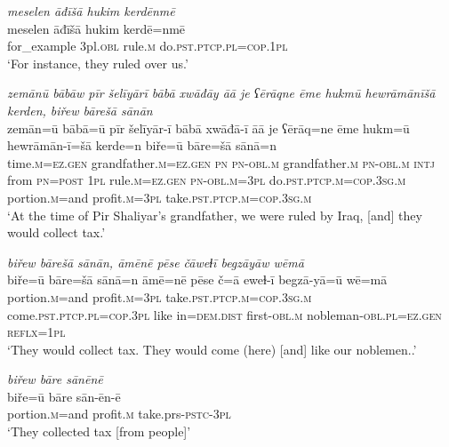 \ea \label{BP.10}
\textit{meselen āđīšā hukim kerdēnmē} \\ 
\gll meselen āđīšā hukim kerdē=nmē \\ 
 for\_example 3pl\textsc{.obl} rule\textsc{.m} do\textsc{.pst}\textsc{.ptcp}\textsc{.pl}\textsc{=cop}\textsc{.\textsc{1pl}} \\ 
\glt `For instance, they ruled over us.'
\z 
 
\ea \label{BP.11}
\textit{zemānū bābāw pīr šelīyārī bābā xwāđāy āā je ʕērāqne ēme hukmū hewrāmānīšā kerden, biřew bārešā sānān} \\ 
\gll zemān=ū bābā=ū pīr šelīyār-ī bābā xwāđā-ī āā je ʕērāq=ne ēme hukm=ū hewrāmān-ī=šā kerde=n biře=ū bāre=šā sānā=n \\ 
 time\textsc{.m}\textsc{=ez.gen} grandfather\textsc{.m}\textsc{=ez.gen} \textsc{pn} \textsc{pn}\textsc{-obl}\textsc{.m} grandfather\textsc{.m} \textsc{pn}\textsc{-obl}\textsc{.m} \textsc{intj} from \textsc{pn}\textsc{=\textsc{post}} \textsc{1pl} rule\textsc{.m}\textsc{=ez.gen} \textsc{pn}\textsc{-obl}\textsc{.m}\textsc{=3pl} do\textsc{.pst}\textsc{.ptcp}\textsc{.m}\textsc{=cop}\textsc{.3sg}\textsc{.m} portion\textsc{.m}=and profit\textsc{.m}\textsc{=3pl} take\textsc{.pst}\textsc{.ptcp}\textsc{.m}\textsc{=cop}\textsc{.3sg}\textsc{.m} \\ 
\glt `At the time of Pir Shaliyar’s grandfather, we were ruled by Iraq, [and] they would collect tax.'
\z 
 
\ea \label{BP.12}
\textit{biřew bārešā sānān, āmēnē pēse čāweɫī begzāyāw wēmā} \\ 
\gll biře=ū bāre=šā sānā=n āmē=nē pēse č=ā eweɫ-ī begzā-yā=ū wē=mā \\ 
 portion\textsc{.m}=and profit\textsc{.m}\textsc{=3pl} take\textsc{.pst}\textsc{.ptcp}\textsc{.m}\textsc{=cop}\textsc{.3sg}\textsc{.m} come\textsc{.pst}\textsc{.ptcp}\textsc{.pl}\textsc{=cop}\textsc{.3pl} like in=\textsc{dem.dist} first\textsc{-obl}\textsc{.m} nobleman\textsc{-obl}\textsc{.pl}\textsc{=ez.gen} \textsc{reflx}\textsc{=\textsc{1pl}} \\ 
\glt `They would collect tax. They would come (here) [and] like our noblemen..'
\z 
 
\ea \label{BP.14}
\textit{biřew bāre sānēnē} \\ 
\gll biře=ū bāre sān-ēn-ē \\ 
 portion\textsc{.m}=and profit\textsc{.m} take.prs\textsc{-pstc}\textsc{-3pl} \\ 
\glt `They collected tax [from people]'
\z 
 

